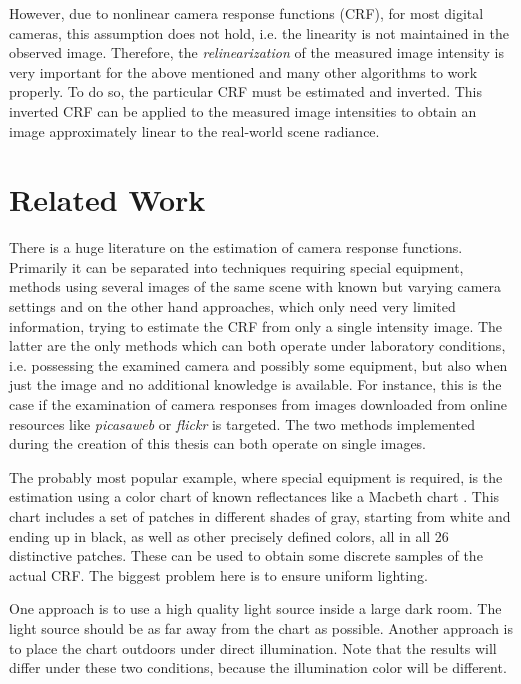 However, due to nonlinear camera response functions (CRF), for most digital cameras, this assumption does not hold, \hbox{i.e.} the linearity is not maintained in the observed image. Therefore, the \emph{relinearization} of the measured image intensity is very important for the above mentioned and many other algorithms to work properly. To do so, the particular CRF must be estimated and inverted. This inverted CRF can be applied to the measured image intensities to obtain an image approximately linear to the real-world scene radiance.





\section{Related Work}
\label{sec:relatedwork}
There is a huge literature on the estimation of camera response functions. Primarily it can be separated into techniques requiring special equipment, methods using several images of the same scene with known but varying camera settings and on the other hand approaches, which only need very limited information, trying to estimate the CRF from only a single intensity image. The latter are the only methods which can both operate under laboratory conditions, \hbox{i.e.} possessing the examined camera and possibly some equipment, but also when just the image and no additional knowledge is available. For instance, this is the case if the examination of camera responses from images downloaded from online resources like \emph{picasaweb} or \emph{flickr} is targeted. The two methods implemented during the creation of this thesis can both operate on single images.

The probably most popular example, where special equipment is required, is the estimation using a color chart of known reflectances like a Macbeth chart \cite{chang1996rgb}. This chart includes a set of patches in different shades of gray, starting from white and ending up in black, as well as other precisely defined colors, all in all 26 distinctive patches. These can be used to obtain some discrete samples of the actual CRF. The biggest problem here is to ensure uniform lighting.

One approach is to use a high quality light source inside a large dark room. The light source should be as far away from the chart as possible. Another approach is to place the chart outdoors under direct illumination. Note that the results will differ under these two conditions, because the illumination color will be different. 

